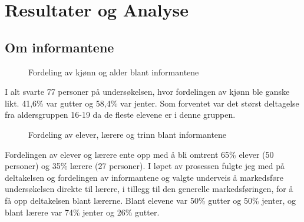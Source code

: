 \section{Resultater og Analyse}\label{resultater}

\subsection{Om informantene}
\begin{figure}[H]
    \centering
    \caption{Fordeling av kjønn og alder blant informantene}
\end{figure}
I alt svarte 77 personer på undersøkelsen, hvor fordelingen av kjønn ble ganske likt.
41,6\% var gutter og 58,4\% var jenter. Som forventet var det størst deltagelse fra aldersgruppen 16-19 da de fleste elevene er i denne gruppen.

\begin{figure}[H]
    \centering
    \caption{Fordeling av elever, lærere og trinn blant informantene}
\end{figure}
Fordelingen av elever og lærere ente opp med å bli omtrent 65\% elever (50 personer) og 35\% lærere (27 personer). I løpet av prosessen fulgte jeg med på deltakelsen og fordelingen av informantene og valgte underveis å markedsføre undersøkelsen direkte til lærere, i tillegg til den generelle markedsføringen, for å få opp deltakelsen blant lærerne. Blant elevene var 50\% gutter og 50\% jenter, og blant lærere var 74\% jenter og 26\% gutter. 

